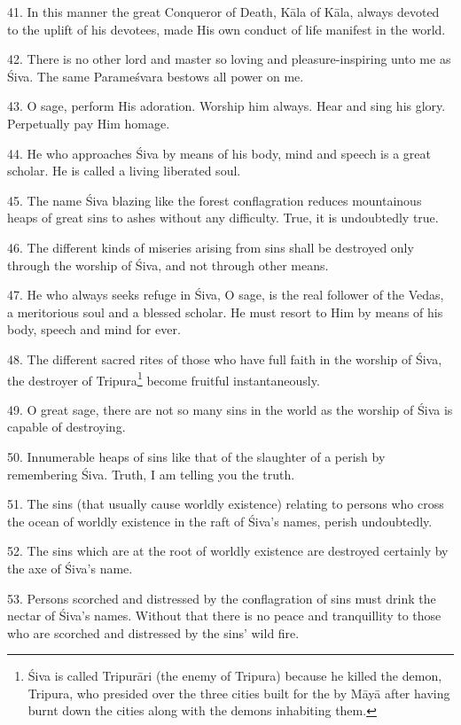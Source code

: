 41. In this manner the great Conqueror of Death, Kāla of Kāla, always devoted to
the uplift of his devotees, made His own conduct of life manifest in the world.

42. There is no other lord and master so loving and pleasure-inspiring unto me
as Śiva. The same Parameśvara bestows all power on me.

43. O sage, perform His adoration. Worship him always. Hear and sing his glory.
Perpetually pay Him homage.

44. He who approaches Śiva by means of his body, mind and speech is a great
scholar. He is called a living liberated soul.

45. The name Śiva blazing like the forest conflagration reduces mountainous
heaps of great sins to ashes without any difficulty. True, it is undoubtedly
true.

46. The different kinds of miseries arising from sins shall be destroyed only
through the worship of Śiva, and not through other means.

47. He who always seeks refuge in Śiva, O sage, is the real follower of
the Vedas, a meritorious soul and a blessed scholar. He must resort to Him by
means of his body, speech and mind for ever.

48. The different sacred rites of those who have full faith in the worship of
Śiva, the destroyer of Tripura\footnote{Śiva is called Tripurāri (the enemy of
Tripura) because he killed the demon, Tripura, who presided over the three
cities built for the  by Māyā \etc after having burnt down
the cities along with the demons inhabiting them.} become fruitful
instantaneously.

49. O great sage, there are not so many sins in the world as the worship of Śiva
is capable of destroying.

50. Innumerable heaps of sins like that of the slaughter of a 
perish by remembering Śiva. Truth, I am telling you the truth.

51. The sins (that usually cause worldly existence) relating to persons who
cross the ocean of worldly existence in the raft of Śiva’s names, perish
undoubtedly.

52. The sins which are at the root of worldly existence are destroyed certainly
by the axe of Śiva’s name.

53. Persons scorched and distressed by the conflagration of sins must drink
the nectar of Śiva’s names. Without that there is no peace and tranquillity to
those who are scorched and distressed by the sins’ wild fire.

